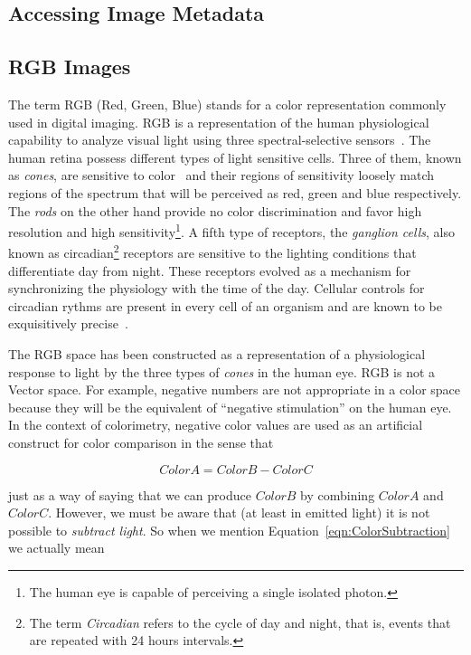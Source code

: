 

\subsection{Accessing Image Metadata}
\label{sec:AccessingImageMetadata}


\subsection{RGB Images}

The term RGB (Red, Green, Blue) stands for a color representation commonly used
in digital imaging. RGB is a representation of the human physiological
capability to analyze visual light using three spectral-selective
sensors~\cite{Malacara2002,Wyszecki2000}. The human retina possess different
types of light sensitive cells. Three of them, known as \emph{cones}, are
sensitive to color~\cite{Gray2003} and their regions of sensitivity loosely
match regions of the spectrum that will be perceived as red, green and blue
respectively. The \emph{rods} on the other hand provide no color discrimination
and favor high resolution and high sensitivity\footnote{The human eye is
capable of perceiving a single isolated photon.}.  A fifth type of receptors,
the \emph{ganglion cells}, also known as circadian\footnote{The term
\emph{Circadian} refers to the cycle of day and night, that is, events that are
repeated with 24 hours intervals.} receptors are sensitive to the lighting
conditions that differentiate day from night.  These receptors evolved as a
mechanism for synchronizing the physiology with the time of the day. Cellular
controls for circadian rythms are present in every cell of an organism and are
known to be exquisitively precise~\cite{Lodish2000}.

The RGB space has been constructed as a representation of a physiological
response to light by the three types of \emph{cones} in the human eye. RGB is
not a Vector space. For example, negative numbers are not appropriate in a
color space because they will be the equivalent of ``negative stimulation'' on
the human eye.  In the context of colorimetry, negative color values are used
as an artificial construct for color comparison in the sense that

\begin{equation}
\label{eqn:ColorSubtraction}
         ColorA = ColorB - ColorC
\end{equation}

just as a way of saying that we can produce $ColorB$ by combining $ColorA$ and
$ColorC$.  However, we must be aware that (at least in emitted light) it is not
possible to \emph{subtract light}. So when we mention
Equation~\ref{eqn:ColorSubtraction} we actually mean

